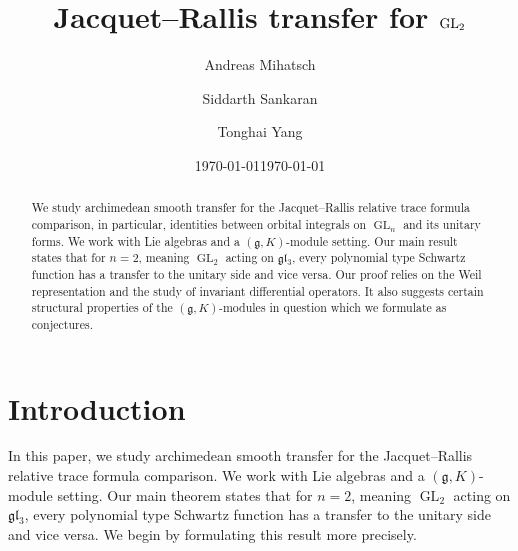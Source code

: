 \documentclass[reqno, 11pt]{amsart} %
\title{Jacquet--Rallis transfer for $\GL_2$}
\date{\today}
\author{Andreas Mihatsch}
\author{Siddarth Sankaran}
\author{Tonghai Yang}
\date{\today}
\numberwithin{equation}{section}
\theoremstyle{plain}
\theoremstyle{definition}
\theoremstyle{remark}
\newcommand{\mfg}{\mathfrak{g}}
\newcommand{\mfl}{\mathfrak{l}}
\newcommand{\mfgl}{\mfg\mfl}
\DeclareMathOperator{\GL}{GL}
\begin{document}
\begin{abstract}
We study archimedean smooth transfer for the Jacquet--Rallis relative trace formula comparison,  in particular, identities between orbital integrals on $\GL_n$ and its unitary forms. We work with Lie algebras and a $(\mfg, K)$-module setting. Our main result states that for $n = 2$, meaning $\GL_2$ acting on $\mfgl_3$, every polynomial type Schwartz function has a transfer to the unitary side and vice versa. Our proof relies on the Weil representation and the study of invariant differential operators. It also suggests certain structural properties of the $(\mfg, K)$-modules in question which we formulate as conjectures.
\end{abstract}

\maketitle
\tableofcontents

\section{Introduction}

In this paper, we study archimedean smooth transfer for the Jacquet--Rallis relative trace formula comparison. We work with Lie algebras and a $(\mfg, K)$-module setting. Our main theorem states that for $n = 2$, meaning $\GL_2$ acting on $\mfgl_3$, every polynomial type Schwartz function has a transfer to the unitary side and vice versa. We begin by formulating this result more precisely.
\end{document}
